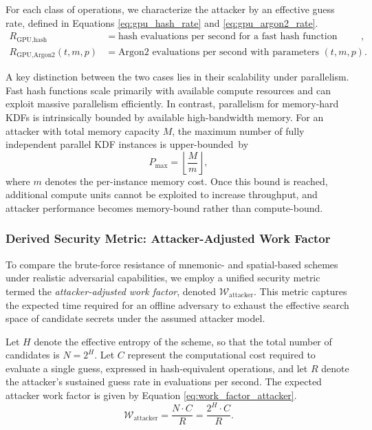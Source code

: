 \documentclass[mathematics,article,accept,pdftex,moreauthors]{Definitions/mdpi}
\begin{document}
For each class of operations, we characterize the attacker by an effective guess rate, defined in Equations \eqref{eq:gpu_hash_rate} and \eqref{eq:gpu_argon2_rate}.
\vspace{-5pt}
\begingroup\makeatletter\def\f@size{9.2}\check@mathfonts
\def\maketag@@@#1{\hbox{\m@th\fontsize{10}{10}\selectfont\normalfont#1}}
\begin{align}
R_{\text{GPU,hash}} &= \text{hash evaluations per second for a fast hash function (e.g., SHA-256)}, \label{eq:gpu_hash_rate} \\
R_{\text{GPU,Argon2}}(t,m,p) &= \text{Argon2 evaluations per second with parameters }(t,m,p). \label{eq:gpu_argon2_rate}
\end{align}
\endgroup

A key distinction between the two cases lies in their scalability under parallelism. Fast hash functions scale primarily with available compute resources and can exploit massive parallelism efficiently. In contrast, parallelism for memory-hard KDFs is intrinsically bounded by available high-bandwidth memory. For an attacker with total memory capacity $M$, the maximum number of fully independent parallel KDF instances is upper-\mbox{bounded by}
\[
P_{\max} = \left\lfloor \frac{M}{m} \right\rfloor ,
\]
where $m$ denotes the per-instance memory cost. Once this bound is reached, additional compute units cannot be exploited to increase throughput, and attacker performance becomes memory-bound rather than compute-bound.

\subsubsection{Derived Security Metric: Attacker-Adjusted Work Factor}

To compare the brute-force resistance of mnemonic- and spatial-based schemes under realistic adversarial capabilities, we employ a unified security metric termed the \emph{attacker-adjusted work factor}, denoted $\mathcal{W}_{\text{attacker}}$. This metric captures the expected time required for an offline adversary to exhaust the effective search space of candidate secrets under the assumed attacker model.

Let $H$ denote the effective entropy of the scheme, so that the total number of candidates is $N = 2^{H}$. Let $C$ represent the computational cost required to evaluate a single guess, expressed in hash-equivalent operations, and let $R$ denote the attacker’s sustained guess rate in evaluations per second. The expected attacker work factor is given by Equation \eqref{eq:work_factor_attacker}.
\begin{equation}
\mathcal{W}_{\text{attacker}} = \frac{N \cdot C}{R} = \frac{2^{H} \cdot C}{R}.
\label{eq:work_factor_attacker}
\end{equation}
\end{document}
